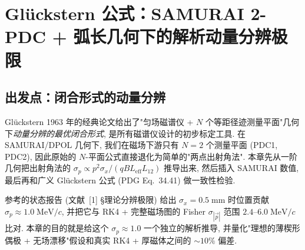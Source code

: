 %
%
%

\providecommand{\StatusReport}{文献~[1]}

\section{Glückstern 公式：SAMURAI 2-PDC + 弧长几何下的解析动量分辨极限}
\label{sec:partIc:gluckstern}

\subsection{出发点：闭合形式的动量分辨}

Glückstern 1963 年的经典论文给出了"匀场磁谱仪 + $N$ 个等距径迹测量平面"几何下\emph{动量分辨的最优闭合形式}, 是所有磁谱仪设计的初步标定工具. 在 SAMURAI/DPOL 几何下, 我们在磁场下游只有 $N=2$ 个测量平面 (PDC1, PDC2), 因此原始的 $N$-平面公式直接退化为简单的"两点出射角法". 本章先从一阶几何把出射角法的 $\sigma_p \propto p^2 \sigma_x / (q B L_\mathrm{eff} L_{12})$ 推导出来, 然后插入 SAMURAI 数值, 最后再和广义 Glückstern 公式 (PDG Eq.~34.41) 做一致性检验.

参考的状态报告 (\StatusReport{} §理论分辨极限) 给出 $\sigma_x = 0.5\;\mathrm{mm}$ 时位置贡献 $\sigma_p \approx 1.0\;\mathrm{MeV}/c$, 并把它与 RK4 + 完整磁场图的 Fisher $\sigma_{|\vec p|}$ 范围 $2.4\text{--}6.0\;\mathrm{MeV}/c$ 比对. 本章的目的就是给这个 $\sigma_p \approx 1.0$ 一个独立的解析推导, 并量化"理想的薄楔形偶极 + 无场漂移"假设和真实 RK4 + 厚磁体之间的 $\sim 10\%$ 偏差.

